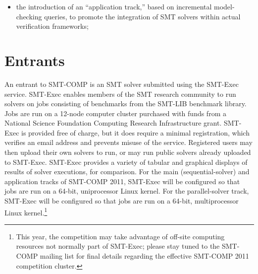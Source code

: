 \documentclass[12pt]{article}
\begin{document}
\begin{itemize}
\item the introduction of an ``application track,'' based on incremental
      model-checking queries, to promote the integration of SMT solvers
      within actual verification frameworks;
\end{itemize}

\section{Entrants}
\label{sec:entrants}

An entrant to SMT-COMP is an SMT solver
submitted using the SMT-Exec service.  SMT-Exec enables members of the
SMT research community to run solvers on jobs consisting of benchmarks
from the SMT-LIB benchmark library.  Jobs are run on a 12-node computer
cluster purchased with funds from a National Science Foundation
Computing Research Infrastructure grant.  SMT-Exec is provided free of
charge, but it does require a minimal registration, which verifies an
email address and prevents misuse of the service.  Registered users
may then upload their own solvers to run, or may run public solvers
already uploaded to SMT-Exec.  SMT-Exec provides a variety of tabular
and graphical displays of results of solver executions, for
comparison. For the main (sequential-solver)
and application tracks 
of SMT-COMP 2011, SMT-Exec will be configured so that jobs are run on a 64-bit,
uniprocessor Linux kernel.  For the parallel-solver track, SMT-Exec
will be configured so that jobs are run on a 64-bit, multiprocessor
Linux kernel.\footnote{This year, the competition may take
  advantage of off-site computing resources not normally part of
  SMT-Exec; please stay tuned to the SMT-COMP mailing list for final
  details regarding the effective SMT-COMP 2011 competition cluster.}
\end{document}
